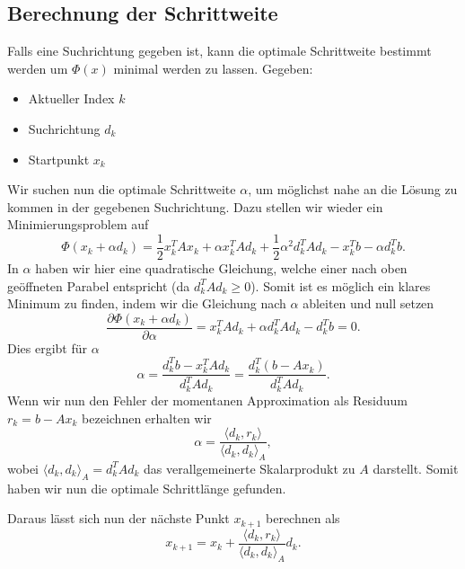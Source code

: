 \subsection{Berechnung der Schrittweite \label{cg:subsection:schrittweite}}
Falls eine Suchrichtung gegeben ist, kann die optimale Schrittweite bestimmt werden um $\Phi(x)$ minimal werden zu lassen.
Gegeben: 
\begin{itemize}
	\item Aktueller Index $k$
	\item Suchrichtung $d_k$
	\item Startpunkt $x_k$
\end{itemize}
Wir suchen nun die optimale Schrittweite $\alpha$, um möglichst nahe an die Lösung zu kommen in der gegebenen Suchrichtung.
Dazu stellen wir wieder ein Minimierungsproblem auf
\begin{equation}
	\Phi(x_k + \alpha d_k) 
	= 
	\frac{1}{2} x_k^T A x_k + \alpha x_k^T A d_k + \frac{1}{2} {\alpha}^2 d_k^T A d_k
	-
	x_k^T b - \alpha d_k^T b .
\end{equation}
In $\alpha$ haben wir hier eine quadratische Gleichung, welche einer nach oben geöffneten Parabel entspricht (da $d_k^T A d_k \ge 0$).
Somit ist es möglich ein klares Minimum zu finden, indem wir die Gleichung nach $\alpha$ ableiten und null setzen
\begin{equation}
	\frac{\partial \Phi(x_k + \alpha d_k) }{\partial \alpha}
	= 
	x_k^T A d_k + \alpha  d_k^T A d_k - d_k^T b
	=
	0 .
\end{equation}
Dies ergibt für $\alpha$ 
\begin{equation}
	\alpha
	= 
	\frac{d_k^T b - x_k^T A d_k}{d_k^T A d_k}
	=
	\frac{d_k^T \left(b - A x_k\right)}{d_k^T A d_k}.
\end{equation}
Wenn wir nun den Fehler der momentanen Approximation als Residuum $r_k = b - A x_k$ bezeichnen erhalten wir
\begin{equation}
	\alpha
	= 
	\frac{\langle d_k , r_k \rangle}{\langle d_k , d_k \rangle_A},
\end{equation}
wobei $\langle d_k , d_k \rangle_A = d_k^T A d_k$ das verallgemeinerte Skalarprodukt zu $A$ darstellt.
Somit haben wir nun die optimale Schrittlänge gefunden.

Daraus lässt sich nun der nächste Punkt $x_{k+1}$ berechnen als
\begin{equation}
	x_{k+1} = x_k + \frac{\langle d_k , r_k \rangle}{\langle d_k , d_k \rangle_A} d_k.
\end{equation}

